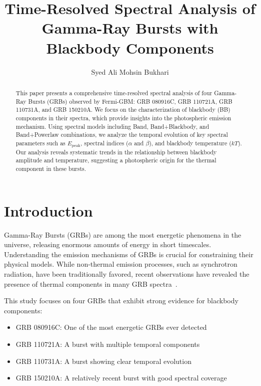 \documentclass[twocolumn]{aastex631}
\begin{document}
    \title{Time-Resolved Spectral Analysis of Gamma-Ray Bursts with Blackbody Components}

    \author{Syed Ali Mohsin Bukhari}

    \begin{abstract}
        This paper presents a comprehensive time-resolved spectral analysis of four Gamma-Ray Bursts (GRBs) observed by Fermi-GBM: GRB 080916C, GRB 110721A, GRB 110731A, and GRB 150210A\@.
        We focus on the characterization of blackbody (BB) components in their spectra, which provide insights into the photospheric emission mechanism.
        Using spectral models including Band, Band+Blackbody, and Band+Powerlaw combinations, we analyze the temporal evolution of key spectral parameters such as $E_{\text{peak}}$, spectral indices ($\alpha$ and $\beta$), and blackbody temperature ($kT$).
        Our analysis reveals systematic trends in the relationship between blackbody amplitude and temperature, suggesting a photospheric origin for the thermal component in these bursts.
    \end{abstract}



    \section{Introduction}
    \label{sec:intro}

    Gamma-Ray Bursts (GRBs) are among the most energetic phenomena in the universe, releasing enormous amounts of energy in short timescales.
    Understanding the emission mechanisms of GRBs is crucial for constraining their physical models.
    While non-thermal emission processes, such as synchrotron radiation, have been traditionally favored, recent observations have revealed the presence of thermal components in many GRB spectra~\citep{Ryde2004, Ryde2005}.

    This study focuses on four GRBs that exhibit strong evidence for blackbody components:
    \begin{itemize}
        \item GRB 080916C: One of the most energetic GRBs ever detected
        \item GRB 110721A: A burst with multiple temporal components
        \item GRB 110731A: A burst showing clear temporal evolution
        \item GRB 150210A: A relatively recent burst with good spectral coverage
    \end{itemize}
\end{document}
